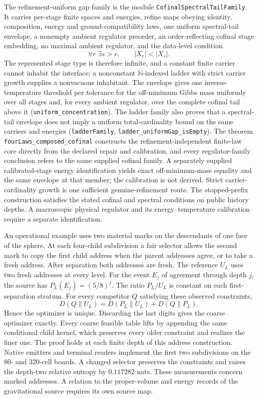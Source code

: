 \documentclass[11pt]{article}
\newcounter{none}
\begin{document}
The refinement-uniform gap family is the module
\texttt{CofinalSpectralTailFamily}. It carries per-stage finite spaces and
energies, refine maps obeying identity, composition, energy and
ground-compatibility laws, one uniform spectral-tail envelope, a nonempty
ambient regulator preorder, an order-reflecting cofinal stage embedding, no
maximal ambient regulator, and the data-level condition
\[
 \forall r\;\exists s>r,
 \qquad |X_r|<|X_s|.
\]
The represented stage type is therefore infinite, and a constant finite
carrier cannot inhabit the interface; a nonconstant \(\mathbb N\)-indexed
ladder with strict carrier growth supplies a nonvacuous inhabitant. The
envelope gives one inverse-temperature threshold per tolerance for the
off-minimum Gibbs mass uniformly over all stages and, for every ambient
regulator, over the complete cofinal tail above it
(\texttt{uniform\_concentration}). The ladder family also proves that a
spectral-tail envelope does not imply a uniform total-cardinality bound on the
same carriers and energies (\texttt{ladderFamily},
\texttt{ladder\_uniformGap\_isEmpty}). The theorem
\texttt{fourLaws\_composed\_cofinal} constructs the refinement-independent
finite-law core directly from the declared repair and calibration, and every
regulator-family conclusion refers to the same supplied cofinal family. A
separately supplied calibrated-stage energy identification yields exact
off-minimum-mass equality and the same envelope at that member; the
calibration is not derived. Strict carrier-cardinality growth is one
sufficient genuine-refinement route. The stopped-prefix construction
satisfies the stated cofinal and spectral conditions on public history
depths. A macroscopic physical regulator and its energy--temperature
calibration require a separate identification.

An operational example uses two material marks on the descendants of
one face of the sphere. At each four-child subdivision a fair selector
allows the second mark to copy the first child address when the parent
addresses agree, or to take a fresh address. After separation both
addresses are fresh. The reference $U_L$ uses two fresh addresses at
every level. For the event $E_j$ of agreement through depth $j$, the
source has $P_L(E_j)=(5/8)^j$.
The ratio $P_L/U_L$ is constant on each first-separation stratum.
For every competitor $Q$ satisfying these observed constraints,
\[
 D(Q\|U_L)=D(P_L\|U_L)+D(Q\|P_L).
\]
Hence the optimizer is unique. Discarding the last digits gives
the coarse optimizer exactly. Every coarse feasible table lifts by
appending the same conditional child kernel, which preserves every
older constraint and realizes the finer one. The proof holds at
each finite depth of this address construction. Native emitters
and terminal readers implement the first two subdivisions on the
80- and 320-cell boards. A changed selector preserves the constraints
and raises the depth-two relative entropy by $0.117282$ nats.
These measurements concern marked addresses. A relation to the
proper-volume and energy records of the gravitational source requires
its own source map.
\end{document}
